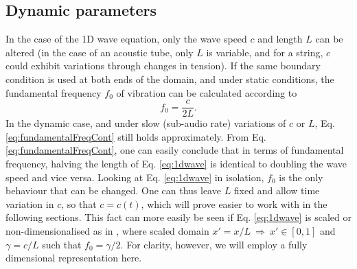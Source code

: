 \subsection{Dynamic parameters}\label{sec:dynamicParamsCont}
In the case of the 1D wave equation, only the wave speed $c$ and length $L$ can be altered (in the case of an acoustic tube, only $L$ is variable, and for a string, $c$ could exhibit variations through changes in tension). If the same boundary condition is used at both ends of the domain, and under static conditions, the fundamental frequency $f_0$ of vibration can be calculated according to
\begin{equation}\label{eq:fundamentalFreqCont}
    f_0 = \frac{c}{2L}.
\end{equation}
In the dynamic case, and under slow (sub-audio rate) variations of $c$ or $L$, Eq. \eqref{eq:fundamentalFreqCont} still holds approximately.
%
From Eq. \eqref{eq:fundamentalFreqCont}, one can easily conclude that in terms of fundamental frequency, halving the length of Eq. \eqref{eq:1dwave} is identical to doubling the wave speed and vice versa. Looking at Eq. \eqref{eq:1dwave} in isolation, $f_0$ is the only behaviour that can be changed. One can thus leave $L$ fixed %
and allow time variation in $c$, so that $c = c(t)$, which will prove easier to work with in the following sections. This fact can more easily be seen if Eq. \eqref{eq:1dwave} is scaled or non-dimensionalised as in \cite{bilbao2009}, where scaled domain  $x' = x/L\  \Rightarrow \ x'\in[0, 1]$ and $\gamma = c/L$ such that $f_0 = \gamma / 2$. For clarity, however, we will employ a fully dimensional representation here.
